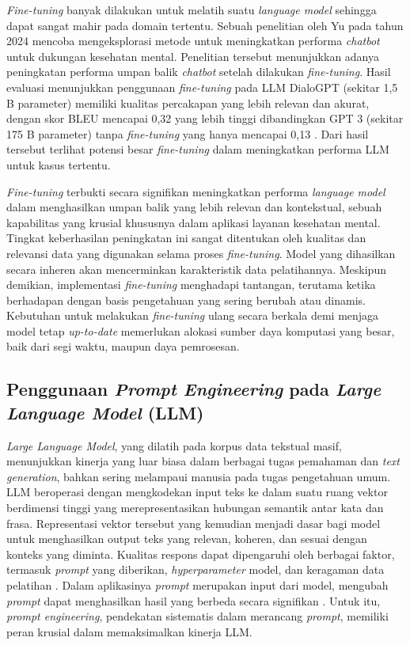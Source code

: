 \textit{Fine-tuning} banyak dilakukan untuk melatih suatu \textit{language model} sehingga dapat sangat mahir pada domain tertentu.
Sebuah penelitian oleh Yu pada tahun 2024 mencoba mengeksplorasi metode untuk meningkatkan performa \textit{chatbot} untuk dukungan kesehatan mental.
Penelitian tersebut menunjukkan adanya peningkatan performa umpan balik \textit{chatbot} setelah dilakukan \textit{fine-tuning}.
Hasil evaluasi menunjukkan penggunaan \textit{fine-tuning} pada LLM DialoGPT (sekitar 1,5 B parameter) memiliki kualitas percakapan yang lebih relevan dan akurat, dengan skor BLEU mencapai 0,32 yang lebih tinggi dibandingkan GPT 3 (sekitar 175 B parameter) tanpa \textit{fine-tuning} yang hanya mencapai 0,13 \cite{yu2024FineTuneOnMentalHealthChatbotExperimental}.
Dari hasil tersebut terlihat potensi besar \textit{fine-tuning} dalam meningkatkan performa LLM untuk kasus tertentu.

\textit{Fine-tuning} terbukti secara signifikan meningkatkan performa \textit{language model} dalam menghasilkan umpan balik yang lebih relevan dan kontekstual, sebuah kapabilitas yang krusial khususnya dalam aplikasi layanan kesehatan mental.
Tingkat keberhasilan peningkatan ini sangat ditentukan oleh kualitas dan relevansi data yang digunakan selama proses \textit{fine-tuning}.
Model yang dihasilkan secara inheren akan mencerminkan karakteristik data pelatihannya.
Meskipun demikian, implementasi \textit{fine-tuning} menghadapi tantangan, terutama ketika berhadapan dengan basis pengetahuan yang sering berubah atau dinamis.
Kebutuhan untuk melakukan \textit{fine-tuning} ulang secara berkala demi menjaga model tetap \textit{up-to-date} memerlukan alokasi sumber daya komputasi yang besar, baik dari segi waktu, maupun daya pemrosesan.


\subsection{Penggunaan \textit{Prompt Engineering} pada \textit{Large Language Model} (LLM)}
\textit{Large Language Model}, yang dilatih pada korpus data tekstual masif, menunjukkan kinerja yang luar biasa dalam berbagai tugas pemahaman dan \textit{text generation}, bahkan sering melampaui manusia pada tugas pengetahuan umum.
LLM beroperasi dengan mengkodekan input teks ke dalam suatu ruang vektor berdimensi tinggi yang merepresentasikan hubungan semantik antar kata dan frasa.
Representasi vektor tersebut yang kemudian menjadi dasar bagi model untuk menghasilkan output teks yang relevan, koheren, dan sesuai dengan konteks yang diminta.
Kualitas respons dapat dipengaruhi oleh berbagai faktor, termasuk \textit{prompt} yang diberikan, \textit{hyperparameter} model, dan keragaman data pelatihan \cite{Chen2025UnleashingPotentialPromptEngineering}.
Dalam aplikasinya \textit{prompt} merupakan input dari model, mengubah \textit{prompt} dapat menghasilkan hasil yang berbeda secara signifikan \cite{Kaddour2023ChallengesApplicationsLLM}.
Untuk itu, \textit{prompt engineering}, pendekatan sistematis dalam merancang \textit{prompt}, memiliki peran krusial dalam memaksimalkan kinerja LLM.


